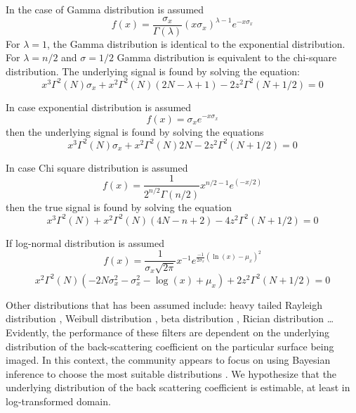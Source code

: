 In the case of Gamma distribution is assumed \cite{Lopes_1990_IGARSS} 
\begin{equation}
f(x) = \frac{\sigma_x}{\Gamma(\lambda)} (x \sigma_x )^{\lambda-1} e^{-x \sigma_x}
\end{equation}
For $\lambda=1$, the Gamma distribution is identical to the exponential distribution. 
For $\lambda=n/2$ and $\sigma=1/2$ Gamma distribution is equivalent to the chi-square distribution.
The underlying signal is found by solving the equation:
\begin{equation}
x^3 \Gamma^2(N) \sigma_x + x^2 \Gamma^2(N) (2N - \lambda + 1) - 2 z^2 \Gamma^2(N+1/2) = 0
\end{equation}

In case exponential distribution is assumed 
\begin{equation}
 f(x) = \sigma_x e^{-x \sigma_x}
\end{equation}
then the underlying signal is found by solving the equations
\begin{equation}
 x^3 \Gamma^2(N) \sigma_x + x^2 \Gamma^2(N) 2N - 2 z^2 \Gamma^2(N+1/2) = 0
\end{equation}

In case Chi square distribution is assumed 
\begin{equation}
 f(x)=\frac{1}{2^{n/2} \Gamma(n/2)} x^{n/2-1} e^{(-x/2)}
\end{equation}
then the true signal is found by solving the equation
\begin{equation}
 x^3 \Gamma^2(N) + x^2 \Gamma^2(N) (4N-n+2) - 4 z^2 \Gamma^2(N+1/2) = 0
\end{equation}

If log-normal distribution is assumed \cite{Medeiros_2003_IntJRemoteSens}
\begin{equation}
 f(x) = \frac{1}{\sigma_x \sqrt{2 \pi}} x^{-1} e^{\frac{-1}{2 \sigma_x} (\ln(x) - \mu_x)^2}
\end{equation}
\begin{equation}
 x^2 \Gamma^2(N) (-2N \sigma^2_x - \sigma^2_x -\log(x) + \mu_x) + 2 z^2 \Gamma^2(N+1/2)=0
\end{equation}

Other distributions that has been assumed include: heavy tailed Rayleigh distribution \cite{Sun_2006_ICVES}, Weibull distribution \cite{Nezry_1997_IGARSS}, beta distribution \cite{Nezry_1997_IGARSS}, Rician distribution \cite{Lewinski_1983_TAntennaPropagation} \dots 
Evidently, the performance of these filters are dependent on the underlying distribution of the back-scattering coefficient on the particular surface being imaged. 
In this context, the community appears to focus on using Bayesian inference to choose the most suitable distributions \cite{Walessa_2000_TGRS}.
We hypothesize that the underlying distribution of the back scattering coefficient is estimable, at least in log-transformed domain.

